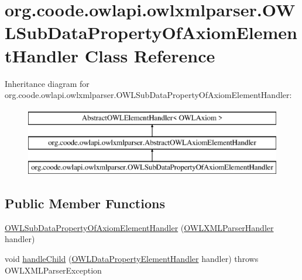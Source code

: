 \hypertarget{classorg_1_1coode_1_1owlapi_1_1owlxmlparser_1_1_o_w_l_sub_data_property_of_axiom_element_handler}{\section{org.\-coode.\-owlapi.\-owlxmlparser.\-O\-W\-L\-Sub\-Data\-Property\-Of\-Axiom\-Element\-Handler Class Reference}
\label{classorg_1_1coode_1_1owlapi_1_1owlxmlparser_1_1_o_w_l_sub_data_property_of_axiom_element_handler}
}
Inheritance diagram for org.\-coode.\-owlapi.\-owlxmlparser.\-O\-W\-L\-Sub\-Data\-Property\-Of\-Axiom\-Element\-Handler\-:\begin{figure}[H]
\begin{center}
\leavevmode
\includegraphics[height=3.000000cm]{classorg_1_1coode_1_1owlapi_1_1owlxmlparser_1_1_o_w_l_sub_data_property_of_axiom_element_handler}
\end{center}
\end{figure}
\subsection*{Public Member Functions}
\begin{DoxyCompactItemize}
\item 
\hyperlink{classorg_1_1coode_1_1owlapi_1_1owlxmlparser_1_1_o_w_l_sub_data_property_of_axiom_element_handler_a2ed1837d28282bff888f49f7488ce9f7}{O\-W\-L\-Sub\-Data\-Property\-Of\-Axiom\-Element\-Handler} (\hyperlink{classorg_1_1coode_1_1owlapi_1_1owlxmlparser_1_1_o_w_l_x_m_l_parser_handler}{O\-W\-L\-X\-M\-L\-Parser\-Handler} handler)
\item 
void \hyperlink{classorg_1_1coode_1_1owlapi_1_1owlxmlparser_1_1_o_w_l_sub_data_property_of_axiom_element_handler_a64c170b04dbf6855e06f6121ac61af07}{handle\-Child} (\hyperlink{classorg_1_1coode_1_1owlapi_1_1owlxmlparser_1_1_o_w_l_data_property_element_handler}{O\-W\-L\-Data\-Property\-Element\-Handler} handler)  throws O\-W\-L\-X\-M\-L\-Parser\-Exception 
\end{DoxyCompactItemize}
